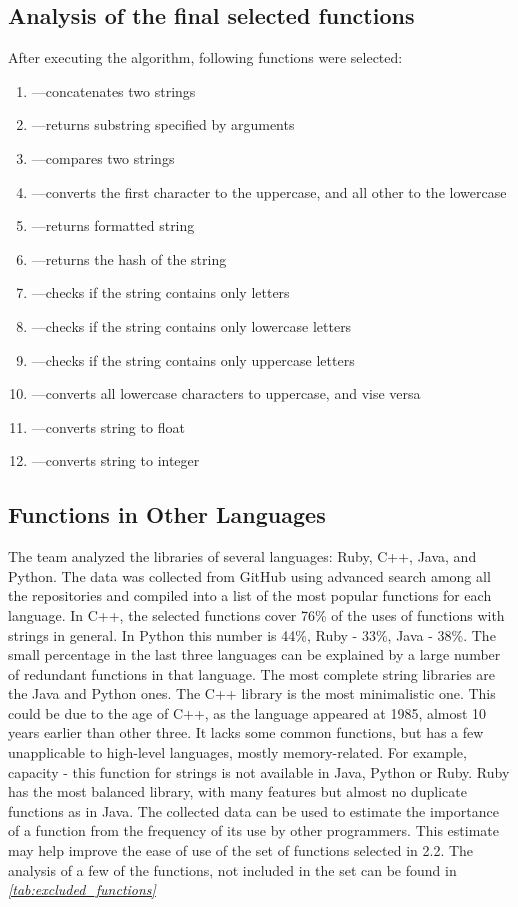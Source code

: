 \documentclass[11pt,nonacm,natbib=false]{acmart}
\begin{document}
\subsection{Analysis of the final selected functions}
After executing the algorithm, following functions were selected:
\begin{enumerate}
    \item {}---concatenates two strings
    \item {}---returns substring specified by arguments
    \item {}---compares two strings
    \item {}---converts the first character to the uppercase, and all other to the lowercase
    \item {}---returns formatted string
    \item {}---returns the hash of the string
    \item {}---checks if the string contains only letters
    \item {}---checks if the string contains only lowercase letters
    \item {}---checks if the string contains only uppercase letters
    \item {}---converts all lowercase characters to uppercase, and vise versa
    \item {}---converts string to float
    \item {}---converts string to integer
\end{enumerate}

\subsection{Functions in Other Languages}
The team analyzed the libraries of several languages: Ruby, C++, Java, and Python. 
The data was collected from GitHub using advanced search among all the repositories and compiled into a list of the most popular functions for each language.
In C++, the selected functions cover 76\% of the uses of functions with strings in general. 
In Python this number is 44\%, Ruby - 33\%, Java - 38\%. 
The small percentage in the last three languages can be explained by a large number of redundant functions in that language. 
The most complete string libraries are the Java and Python ones. The C++ library is the most minimalistic one. 
This could be due to the age of C++, as the language appeared at 1985, almost 10 years earlier than other three. It lacks some common functions, but has a few unapplicable to high-level languages, mostly memory-related. 
For example, capacity - this function for strings is not available in Java, Python or Ruby. 
Ruby has the most balanced library, with many features but almost no duplicate functions
as in Java.
The collected data can be used to estimate the importance of a function from the frequency of its use by other programmers. This estimate may help improve the ease of use of the set of functions selected in 2.2. The analysis of a few of the functions, not included in the set can be found in \emph{\autoref{tab:excluded_functions}}
\end{document}
